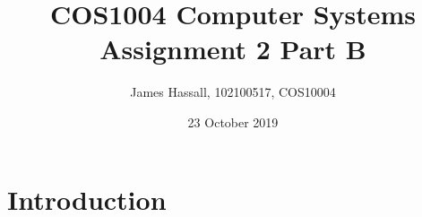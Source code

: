\documentclass{article}
\title{COS1004 Computer Systems Assignment 2 Part B}
\author{James Hassall, 102100517, COS10004}
\date{23 October 2019}
\begin{document}
\maketitle

\pagebreak
\section*{Introduction}
\end{document}
